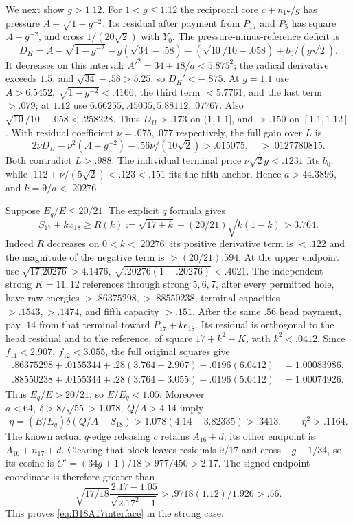 We next show \(g>1.12\). For \(1<g\leq1.12\) the reciprocal core
\(c+n_{17}/g\) has pressure \(A-\sqrt{1-g^{-2}}\).
Its residual after payment from \(P_{17}\) and \(P_5\) has square
\(.4+g^{-2}\), and cross \(1/(20\sqrt2)\) with \(Y_0\).
The pressure-minus-reference deficit is
\[
 D_H=A-\sqrt{1-g^{-2}}-g(\sqrt{34}-.58)
       -(\sqrt{10}/10-.058)+b_0/(g\sqrt2).
\]
It decreases on this interval: \(A'^2=34+18/a<5.875^2\);
the radical derivative exceeds \(1.5\), and
\(\sqrt{34}-.58>5.25\), so \(D_H'<-.875\).
At \(g=1.1\) use \(A>6.5452,\ \sqrt{1-g^{-2}}<.4166\),
the third term \(<5.7761\), and the last term \(>.079\);
at \(1.12\) use \(6.66255,.45035,5.88112,.07767\).
Also \(\sqrt{10}/10-.058<.258228\).
Thus \(D_H>.173\) on \((1,1.1]\), and \(>.150\) on
\([1.1,1.12]\).
With residual coefficient \(\nu=.075,.077\) respectively, the
full gain over \(L\) is
\[
 2\nu D_H-\nu^2(.4+g^{-2})-.56\nu/(10\sqrt2)
 >.015075,\quad >.0127780815 .
\]
Both contradict \(L>.988\). The individual terminal price
\(\nu\sqrt2g<.1231\) fits \(b_0\), while
\(.112+\nu/(5\sqrt2)<.123<.151\) fits the fifth anchor.
Hence \(a>44.3896\), and \(k=9/a<.20276\).

Suppose \(E_q/E\leq20/21\).
The explicit \(q\) formula gives
\[
 S_{17}+kx_{18}\geq
 R(k):=\sqrt{17+k}-(20/21)\sqrt{k(1-k)}>3.764 .
\]
Indeed \(R\) decreases on \(0<k<.20276\): its positive derivative
term is \(<.122\) and the magnitude of the negative term is
\(>(20/21).594\). At the upper endpoint use
\(\sqrt{17.20276}>4.1476,\ \sqrt{.20276(1-.20276)}<.4021\).
The independent strong \(K=11,12\) references through strong \(5,6,7\),
after every permitted hole, have raw energies
\(>.86375298,>.88550238\), terminal capacities \(>.1543,>.1474\),
and fifth capacity \(>.151\).
After the same \(.56\) head payment, pay \(.14\) from that terminal
toward \(P_{17}+ke_{18}\).
Its residual is orthogonal to the head residual and to the reference,
of square \(17+k^2-K\), with \(k^2<.0412\). Since
\(f_{11}<2.907,\ f_{12}<3.055\), the full original squares give
\[
\begin{split}
 .86375298+.0155344+.28(3.764-2.907)-.0196(6.0412)
 &=1.00083986,\\
 .88550238+.0155344+.28(3.764-3.055)-.0196(5.0412)
 &=1.00074926 .
\end{split}
\]
Thus \(E_q/E>20/21\), so \(E/E_q<1.05\).
Moreover \(a<64,\ \delta>8/\sqrt{55}>1.078,\ Q/A>4.14\) imply
\[
 \eta=(E/E_q)\delta(Q/A-S_{18})
 >1.078(4.14-3.82335)>.3413,\qquad \eta^2>.1164 .
\]
The known actual \(q\)-edge releasing \(c\) retains \(A_{16}+d\);
its other endpoint is \(A_{16}+n_{17}+d\). Clearing that block
leaves residuals \(9/17\) and cross \(-g-1/34\), so its cosine is
\(C'=(34g+1)/18>977/450>2.17\).
The signed endpoint coordinate is therefore greater than
\[
 \sqrt{17/18}\frac{2.17-1.05}{\sqrt{2.17^2-1}}
 >.9718(1.12)/1.926>.56 .
\]
This proves \eqref{eq:B18A17interface} in the strong case.

